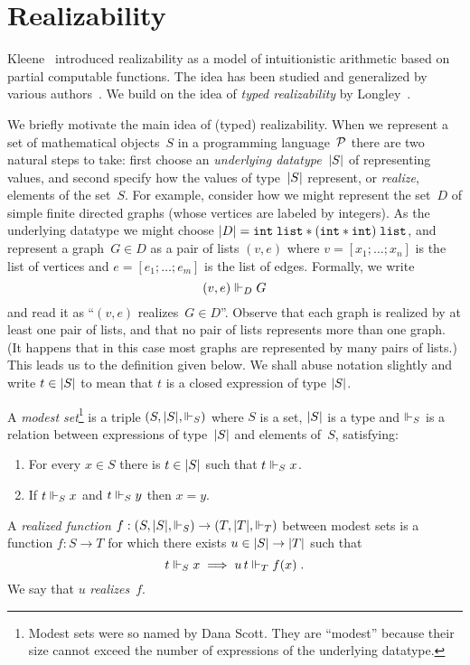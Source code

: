 
\section{Realizability}
\label{sec:realizability}

Kleene~\cite{KleeneSC:intint} introduced realizability as a model of
intuitionistic arithmetic based on partial computable functions. The
idea has been studied and generalized by various
authors~\cite{TroelstraA:rea,HylandJ:efft,HylandJ:trit,OostenJ:exer}.
We build on the idea of \emph{typed realizability} by
Longley~\cite{Longley00}.

We briefly motivate the main idea of (typed) realizability. When we
represent a set of mathematical objects~$S$ in a programming
language~$\mathcal{P}$ there are two natural steps to take: first choose an
\emph{underlying datatype~$|S|$} of representing values, and second
specify how the values of type~$|S|$ represent, or \emph{realize},
elements of the set~$S$. For example, consider how we might represent
the set~$D$ of simple finite directed graphs (whose vertices are
labeled by integers). As the underlying datatype we might choose
$|D| = \mathtt{int} \; \mathtt{list} * (\mathtt{int} *
\mathtt{int}) \; \mathtt{list}$, and represent a graph~$G \in D$ as a
pair of lists $(v,e)$ where $v = [x_1; \ldots; x_n]$ is the list of
vertices and $e = [e_1; \ldots; e_m]$ is the list of edges. Formally,
we write
%
\begin{equation*}
  (v, e) \Vdash_D G
\end{equation*}
%
and read it as ``$(v,e)$ realizes~$G \in D$''. Observe that each graph
is realized by at least one pair of lists, and that no pair of lists
represents more than one graph. (It happens that in this case most graphs are
represented by many pairs of lists.) This leads us to the definition given
below. We shall abuse notation slightly and write $t \in |S|$ to
mean that $t$ is a closed expression of type $|S|$.

\begin{definition}
  A \emph{modest set}\footnote{Modest sets were so named by Dana
    Scott. They are ``modest'' because their size cannot exceed the
    number of expressions of the underlying datatype.} is a triple
  $(S, |S|, {\Vdash_S})$ where $S$ is a set, $|S|$ is a type and
  $\Vdash_S$ is a relation between expressions of type~$|S|$ and
  elements of~$S$, satisfying:
  \begin{enumerate}
  \item For every $x \in S$ there is $t \in |S|$ such that $t \Vdash_S
    x$.
  \item If $t \Vdash_S x$ and $t \Vdash_S y$ then $x = y$.
  \end{enumerate}
  A \emph{realized function} $f : (S, |S|, {\Vdash_S}) \to (T, |T|,
  {\Vdash_T})$ between modest sets is a function $f : S \to T$ for which
  there exists $u \in |S| \to |T|$ such that
  \begin{equation*}
    t \Vdash_S x \implies u\,t \Vdash_T f(x) \;.
  \end{equation*}
  We say that $u$ \emph{realizes}~$f$.
\end{definition}


